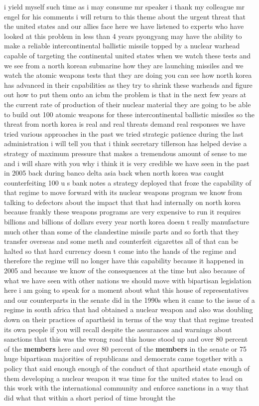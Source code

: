 \documentclass{article}
\begin{document}
\vspace{8mm}
i yield myself such time as i may consume mr speaker i thank my colleague mr engel for his comments i will return to this theme about the urgent threat that the united states and our allies face here we have listened to experts who have looked at this problem in less than 4 years pyongyang may have the ability to make a reliable intercontinental ballistic missile topped by a nuclear warhead capable of targeting the continental united states when we watch these tests and we see from a north korean submarine how they are launching missiles and we watch the atomic weapons tests that they are doing you can see how north korea has advanced in their capabilities as they try to shrink these warheads and figure out how to put them onto an icbm the problem is that in the next few years at the current rate of production of their nuclear material they are going to be able to build out 100 atomic weapons for these intercontinental ballistic missiles so the threat from north korea is real and real threats demand real responses we have tried various approaches in the past we tried strategic patience during the last administration i will tell you that i think secretary tillerson has helped devise a strategy of maximum pressure that makes a tremendous amount of sense to me and i will share with you why i think it is very credible we have seen in the past in 2005 back during banco delta asia back when north korea was caught counterfeiting 100 u s bank notes a strategy deployed that froze the capability of that regime to move forward with its nuclear weapons program we know from talking to defectors about the impact that that had internally on north korea because frankly these weapons programs are very expensive to run it requires billions and billions of dollars every year north korea doesn t really manufacture much other than some of the clandestine missile parts and so forth that they transfer overseas and some meth and counterfeit cigarettes all of that can be halted so that hard currency doesn t come into the hands of the regime and therefore the regime will no longer have this capability because it happened in 2005 and because we know of the consequences at the time but also because of what we have seen with other nations we should move with bipartisan legislation here i am going to speak for a moment about what this house of representatives and our counterparts in the senate did in the 1990s when it came to the issue of a regime in south africa that had obtained a nuclear weapon and also was doubling down on their practices of apartheid in terms of the way that that regime treated its own people if you will recall despite the assurances and warnings about sanctions that this was the wrong road this house stood up and over 80 percent of the {\bf \color{red} members} here and over 80 percent of the {\bf \color{red} members} in the senate or 75 huge bipartisan majorities of republicans and democrats came together with a policy that said enough enough of the conduct of that apartheid state enough of them developing a nuclear weapon it was time for the united states to lead on this work with the international community and enforce sanctions in a way that did what that within a short period of time brought the 
\end{document}
